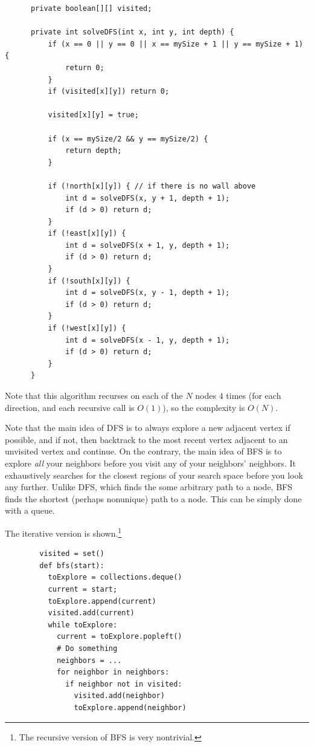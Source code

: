 \documentclass{article}
\begin{document}
\begin{example}
\begin{lstlisting}
      private boolean[][] visited; 

      private int solveDFS(int x, int y, int depth) {
          if (x == 0 || y == 0 || x == mySize + 1 || y == mySize + 1) {
              return 0; 
          }
          if (visited[x][y]) return 0; 
          
          visited[x][y] = true; 
          
          if (x == mySize/2 && y == mySize/2) {
              return depth; 
          }
          
          if (!north[x][y]) { // if there is no wall above
              int d = solveDFS(x, y + 1, depth + 1); 
              if (d > 0) return d; 
          }
          if (!east[x][y]) {
              int d = solveDFS(x + 1, y, depth + 1); 
              if (d > 0) return d; 
          }
          if (!south[x][y]) {
              int d = solveDFS(x, y - 1, depth + 1); 
              if (d > 0) return d; 
          }
          if (!west[x][y]) {
              int d = solveDFS(x - 1, y, depth + 1); 
              if (d > 0) return d; 
          }
      }
      \end{lstlisting}
      Note that this algorithm recurses on each of the $N$ nodes $4$ times (for each direction, and each recursive call is $O(1)$), so the complexity is $O(N)$. 
    \end{example}

    Note that the main idea of DFS is to always explore a new adjacent vertex if possible, and if not, then backtrack to the most recent vertex adjacent to an unvisited vertex and continue. On the contrary, the main idea of BFS is to explore \textit{all} your neighbors before you visit any of your neighbors' neighbors. It exhaustively searches for the closest regions of your search space before you look any further. Unlike DFS, which finds the some arbitrary path to a node, BFS finds the shortest (perhaps nonunique) path to a node. This can be simply done with a queue. 

    \begin{definition}[BFS]
      The iterative version is shown.\footnote{The recursive version of BFS is very nontrivial.}
      \begin{lstlisting}
        visited = set() 
        def bfs(start): 
          toExplore = collections.deque() 
          current = start; 
          toExplore.append(current) 
          visited.add(current) 
          while toExplore: 
            current = toExplore.popleft() 
            # Do something 
            neighbors = ... 
            for neighbor in neighbors: 
              if neighbor not in visited: 
                visited.add(neighbor) 
                toExplore.append(neighbor)
      \end{lstlisting}
    \end{definition}
\end{document}
